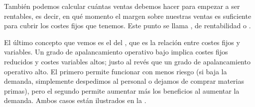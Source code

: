 \documentclass[nochap,palatino,shortheader]{apuntes}
\newcommand{\study}[1]{#1} \newcommand{\substudy}[1]{#1}
\begin{document}
También podemos calcular cuántas ventas debemos hacer para empezar a ser rentables, es decir, en qué momento el margen sobre nuestras ventas es suficiente para cubrir los costes fijos que tenemos.
 Este punto se llama , de rentabilidad o .

El último concepto que vemos es el del , que es la \substudy{relación entre costes fijos y variables}.
Un grado de \study{apalancamiento operativo} \study{bajo} implica \substudy{costes fijos reducidos y costes variables altos}; justo al revés que un grado de apalancamiento operativo alto. El primero permite funcionar con menos riesgo (si baja la demanda, simplemente despedimos al personal o dejamos de comprar materias primas), pero el segundo permite aumentar más los beneficios al aumentar la demanda. Ambos casos están ilustrados en la .
\end{document}
